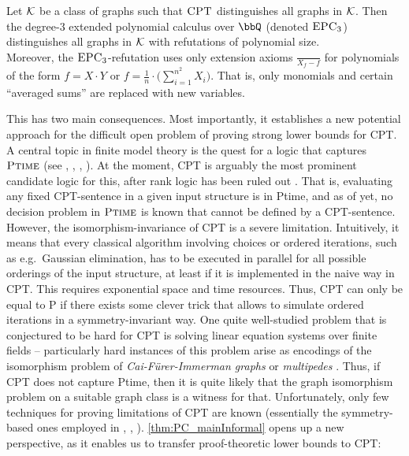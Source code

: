 \documentclass[a4paper,UKenglish,cleveref, autoref, thm-restate]{lipics-v2021}
\newcommand{\CPT}{\mbox{\sc CPT}}
\newcommand{\EPC}{\mbox{\sc EPC}}
\newcommand{\ptime}{\mbox{\sc Ptime}}
\newcommand{\Kk}{{\cal K}}
\begin{document}
	\begin{theorem}
		\label{thm:PC_mainInformal}
		Let $\Kk$ be a class of graphs such that $\CPT$ distinguishes all graphs in $\Kk$. Then the degree-$3$ extended polynomial calculus over $\bbQ$ (denoted $\EPC_3$) distinguishes all graphs in $\Kk$ with refutations of polynomial size.\\
		Moreover, the $\EPC_3$-refutation uses only extension axioms $\frac{}{X_f - f}$ for polynomials of the form $f = X \cdot Y$ or $f = \frac{1}{n} \cdot \Big(\sum_{i=1}^{n^2} X_i \Big)$. That is, only monomials and certain ``averaged sums'' are replaced with new variables.
	\end{theorem}
	This has two main consequences. Most importantly, it establishes a new potential approach for the difficult open problem of proving strong lower bounds for CPT. A central topic in finite model theory is the quest for a logic that captures $\ptime$ (see \cite{chandra1980structure}, \cite{grohe2008quest}, \cite{gurevich1985logic}, \cite{pakusa2015linear}). At the moment, CPT is arguably the most prominent candidate logic for this, after rank logic has been ruled out \cite{lichter}.
	That is, evaluating any fixed CPT-sentence in a given input structure is in \ptime, and as of yet, no decision problem in $\ptime$ is known that cannot be defined by a CPT-sentence. However, the isomorphism-invariance of CPT is a severe limitation. Intuitively, it means that every classical algorithm involving choices or ordered iterations, such as e.g.\ Gaussian elimination, has to be executed in parallel for all possible orderings of the input structure, at least if it is implemented in the naive way in CPT. This requires exponential space and time resources. Thus, CPT can only be equal to P if there exists some clever trick that allows to simulate ordered iterations in a symmetry-invariant way. 
	One quite well-studied problem that is conjectured to be hard for CPT is solving linear equation systems over finite fields -- particularly hard instances of this problem arise as encodings of the isomorphism problem of \emph{Cai-Fürer-Immerman graphs} \cite{caifurimm92} or \emph{multipedes} \cite{multipedes}. Thus, if CPT does not capture \ptime, then it is quite likely that the graph isomorphism problem on a suitable graph class is a witness for that. Unfortunately, only few techniques for proving limitations of CPT are known (essentially the symmetry-based ones employed in \cite{dawar2008}, \cite{rossman2010choiceless}, \cite{pago}).
 	\autoref{thm:PC_mainInformal} opens up a new perspective, as it enables us to transfer proof-theoretic lower bounds to CPT:
\end{document}
